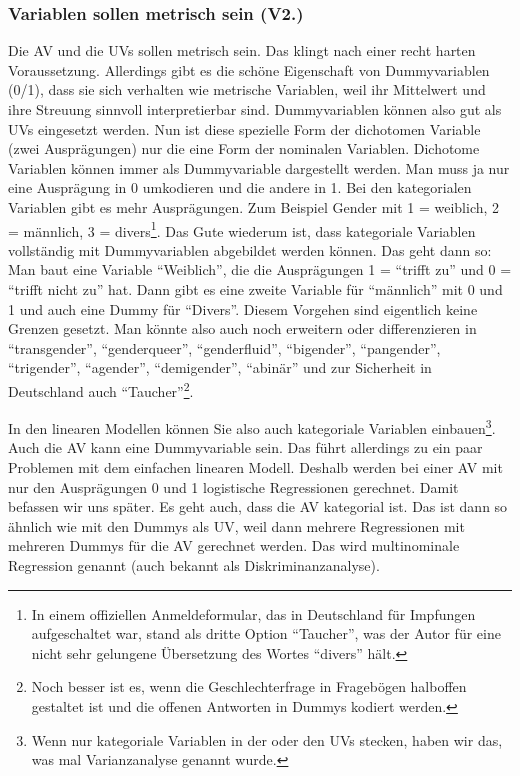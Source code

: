 \documentclass[
  10pt,
  letterpaper,
  a4paper, twoside]{scrreprt}
\begin{document}
\subsubsection{Variablen sollen metrisch sein
(V2.)}\label{variablen-sollen-metrisch-sein-v2.}

Die AV und die UVs sollen metrisch sein. Das klingt nach einer recht
harten Voraussetzung. Allerdings gibt es die schöne Eigenschaft von
Dummyvariablen (0/1), dass sie sich verhalten wie metrische Variablen,
weil ihr Mittelwert und ihre Streuung sinnvoll interpretierbar sind.
Dummyvariablen können also gut als UVs eingesetzt werden. Nun ist diese
spezielle Form der dichotomen Variable (zwei Ausprägungen) nur die eine
Form der nominalen Variablen. Dichotome Variablen können immer als
Dummyvariable dargestellt werden. Man muss ja nur eine Ausprägung in 0
umkodieren und die andere in 1. Bei den kategorialen Variablen gibt es
mehr Ausprägungen. Zum Beispiel Gender mit 1 = weiblich, 2 = männlich, 3
= divers\footnote{In einem offiziellen Anmeldeformular, das in
  Deutschland für Impfungen aufgeschaltet war, stand als dritte Option
  \enquote{Taucher}, was der Autor für eine nicht sehr gelungene
  Übersetzung des Wortes \enquote{divers} hält.}. Das Gute wiederum ist,
dass kategoriale Variablen vollständig mit Dummyvariablen abgebildet
werden können. Das geht dann so: Man baut eine Variable
\enquote{Weiblich}, die die Ausprägungen 1 = \enquote{trifft zu} und 0 =
\enquote{trifft nicht zu} hat. Dann gibt es eine zweite Variable für
\enquote{männlich} mit 0 und 1 und auch eine Dummy für \enquote{Divers}.
Diesem Vorgehen sind eigentlich keine Grenzen gesetzt. Man könnte also
auch noch erweitern oder differenzieren in \enquote{transgender},
\enquote{genderqueer}, \enquote{genderfluid}, \enquote{bigender},
\enquote{pangender}, \enquote{trigender}, \enquote{agender},
\enquote{demigender}, \enquote{abinär} und zur Sicherheit in Deutschland
auch \enquote{Taucher}\footnote{Noch besser ist es, wenn die
  Geschlechterfrage in Fragebögen halboffen gestaltet ist und die
  offenen Antworten in Dummys kodiert werden.}.

In den linearen Modellen können Sie also auch kategoriale Variablen
einbauen\footnote{Wenn nur kategoriale Variablen in der oder den UVs
  stecken, haben wir das, was mal Varianzanalyse genannt wurde.}. Auch
die AV kann eine Dummyvariable sein. Das führt allerdings zu ein paar
Problemen mit dem einfachen linearen Modell. Deshalb werden bei einer AV
mit nur den Ausprägungen 0 und 1 logistische Regressionen gerechnet.
Damit befassen wir uns später. Es geht auch, dass die AV kategorial ist.
Das ist dann so ähnlich wie mit den Dummys als UV, weil dann mehrere
Regressionen mit mehreren Dummys für die AV gerechnet werden. Das wird
multinominale Regression genannt (auch bekannt als Diskriminanzanalyse).
\end{document}
